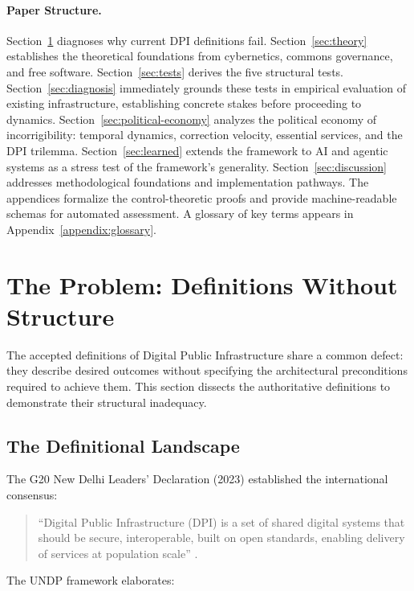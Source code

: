 \documentclass{article}
\begin{document}
\paragraph{Paper Structure.} Section~\ref{sec:problem} diagnoses why current DPI definitions fail. Section~\ref{sec:theory} establishes the theoretical foundations from cybernetics, commons governance, and free software. Section~\ref{sec:tests} derives the five structural tests. Section~\ref{sec:diagnosis} immediately grounds these tests in empirical evaluation of existing infrastructure, establishing concrete stakes before proceeding to dynamics. Section~\ref{sec:political-economy} analyzes the political economy of incorrigibility: temporal dynamics, correction velocity, essential services, and the DPI trilemma. Section~\ref{sec:learned} extends the framework to AI and agentic systems as a stress test of the framework's generality. Section~\ref{sec:discussion} addresses methodological foundations and implementation pathways. The appendices formalize the control-theoretic proofs and provide machine-readable schemas for automated assessment. A glossary of key terms appears in Appendix~\ref{appendix:glossary}.

\section{The Problem: Definitions Without Structure}
\label{sec:problem}

The accepted definitions of Digital Public Infrastructure share a common defect: they describe desired outcomes without specifying the architectural preconditions required to achieve them. This section dissects the authoritative definitions to demonstrate their structural inadequacy.

\subsection{The Definitional Landscape}

The G20 New Delhi Leaders' Declaration (2023) established the international consensus:

\begin{quote}
``Digital Public Infrastructure (DPI) is a set of shared digital systems that should be secure, interoperable, built on open standards, enabling delivery of services at population scale'' \citep{g20}.
\end{quote}

The UNDP framework \citep{undp} elaborates:
\end{document}
